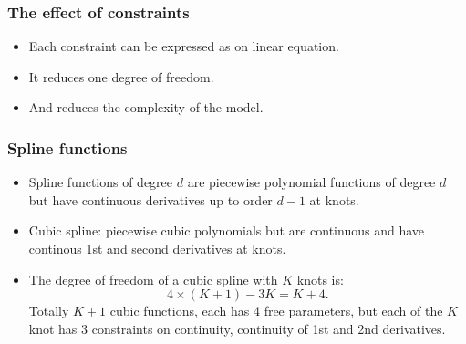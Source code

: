 \documentclass{beamer}
\begin{document}
                 \begin{frame}
                 	\frametitle{The effect of constraints  }
                 	\begin{itemize}
                 		\item Each constraint can be expressed as on linear equation. 
                 		\item It reduces one degree of freedom.
                 		\item And reduces the complexity of the model. 
                 		
                 	  
                 	\end{itemize}
                 \end{frame} 
                 
                  
                  \begin{frame}
                  	\frametitle{Spline functions  }
                  	\begin{itemize}
                  		\item Spline functions of degree $d$ are piecewise polynomial functions
                  		of degree $d$ but have continuous derivatives up to order $d-1$ at knots.
                  		
                  		\item Cubic spline: piecewise cubic polynomials but are continuous and have continous 1st and
                  		second derivatives at knots.
                  		
                  		\item The degree of freedom of a cubic spline with $K$ knots is:
                  		$$ 4\times (K+1) - 3K = K+4.$$
                  		Totally $K+1$ cubic functions, each has 4 free parameters, but
                  		each of the $K$ knot has 3 constraints on continuity, continuity of 1st and 2nd derivatives. 
                  		
                  	\end{itemize}
                  \end{frame} 
                  
\end{document}
